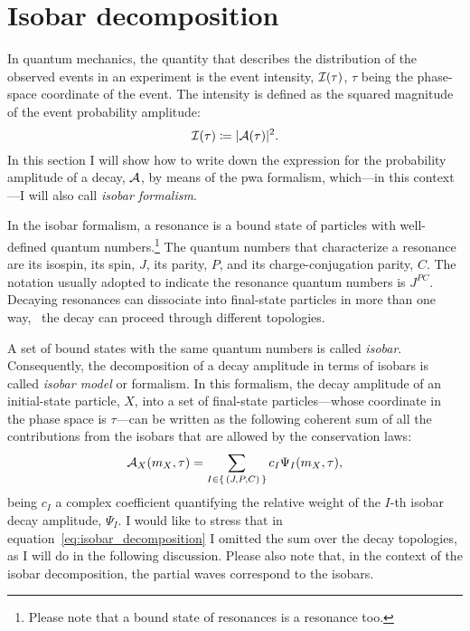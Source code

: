 \section{Isobar decomposition}

    In quantum mechanics, the quantity that describes the distribution of the observed events in an experiment is the event intensity, $\mathcal{I}(\tau)$, $\tau$ being the phase-space coordinate of the event.
    The intensity is defined as the squared magnitude of the event probability amplitude:
    \begin{equation}
        \mathcal{I}(\tau) \coloneqq \lvert\mathcal{A}(\tau)\rvert^2.
    \end{equation}
    In this section I will show how to write down the expression for the probability amplitude of a decay, $\mathcal{A}$, by means of the \ac{pwa} formalism, which---in this context---I will also call \emph{isobar formalism}.


    In the isobar formalism, a resonance is a bound state of particles with well-defined quantum numbers.\footnote{Please note that a bound state of resonances is a resonance too.}
    The quantum numbers that characterize a resonance are its isospin, its spin, $J$, its parity, $P$, and its charge-conjugation parity, $C$.
    The notation usually adopted to indicate the resonance quantum numbers is $J^{PC}$.
    Decaying resonances can dissociate into final-state particles in more than one way, \ie~the decay can proceed through different topologies.


    A set of bound states with the same quantum numbers is called \emph{isobar}.
    Consequently, the decomposition of a decay amplitude in terms of isobars is called \emph{isobar model} or formalism.
    In this formalism, the decay amplitude of an initial-state particle, $X$, into a set of final-state particles---whose coordinate in the phase space is $\tau$---can be written as the following coherent sum of all the contributions from the isobars that are allowed by the conservation laws:
    \begin{equation}\label{eq:isobar_decomposition}
        \mathcal{A}_X(m_X,\tau) = \sum_{I\in\set{(J, P, C)}} c_I \Psi_I(m_X, \tau),
    \end{equation}
    being $c_I$ a complex coefficient quantifying the relative weight of the $I$-th isobar decay amplitude, $\Psi_I$.
    I would like to stress that in equation~\eqref{eq:isobar_decomposition} I omitted the sum over the decay topologies, as I will do in the following discussion.
    Please also note that, in the context of the isobar decomposition, the partial waves correspond to the isobars.


